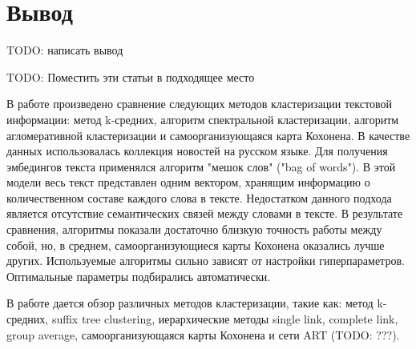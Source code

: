 \section{Вывод}
TODO: написать вывод

TODO: Поместить эти статьи в подходящее место

В работе \cite{compare-text-clustering-sokolov} произведено сравнение следующих методов кластеризации текстовой информации: метод k-средних, алгоритм спектральной кластеризации, алгоритм агломеративной кластеризации и самоорганизующаяся карта Кохонена. В качестве данных использовалась коллекция новостей на русском языке. Для получения эмбедингов текста применялся алгоритм "мешок слов" ("bag of words"). В этой модели весь текст представлен одним вектором, хранящим информацию о количественном составе каждого слова в тексте. Недостатком данного подхода является отсутствие семантических связей между словами в тексте. В результате сравнения, алгоритмы показали достаточно близкую точность работы между собой, но, в среднем, самоорганизующиеся карты Кохонена оказались лучше других. Используемые алгоритмы сильно зависят от настройки гиперпараметров. Оптимальные параметры подбирались автоматически.

В работе \cite{method-text-clustering-andreev} дается обзор различных методов кластеризации, такие как: метод k-средних, suffix tree clustering, иерархические методы single link, complete link, group average, самоорганизующаяся карты Кохонена и сети ART (TODO: ???).
